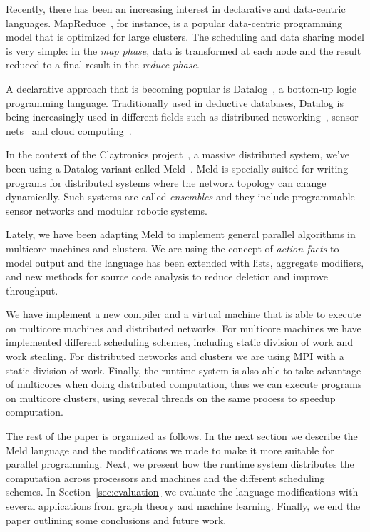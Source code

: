 \documentclass[preprint]{sigplanconf}
\begin{document}
Recently, there has been an increasing interest in declarative and data-centric languages.
MapReduce~\cite{Dean:2008:MSD:1327452.1327492}, for instance, is a popular data-centric programming
model that is optimized for large clusters. The scheduling and data sharing model is very simple:
in the \emph{map phase}, data is transformed at each node and the result reduced to a final
result in the \emph{reduce phase}.

A declarative approach that is becoming popular is Datalog~\cite{Ullman:1990:PDK:533142}, a
bottom-up logic programming language.
Traditionally used in deductive databases, Datalog is being increasingly used in different fields
such as distributed networking~\cite{Loo-condie-garofalakis-p2}, sensor
nets~\cite{Chu:2007:DID:1322263.1322281} and cloud computing~\cite{alvaro:boom}.

In the context of the Claytronics project~\cite{goldstein-computer05}, a massive distributed system,
we've been using a Datalog variant called Meld~\cite{ashley-rollman-iclp09, ashley-rollman-derosa-iros07wksp}.
Meld is specially suited for writing programs for distributed systems where the network
topology can change dynamically. Such systems are called \emph{ensembles} and they include
programmable sensor networks and modular robotic systems.

Lately, we have been adapting Meld to implement general parallel algorithms in multicore machines
and clusters. We are using the concept of \emph{action facts} to model output and the language
has been extended with lists, aggregate modifiers, and new methods for source code analysis to
reduce deletion and improve throughput.

We have implement a new compiler and a virtual machine that is able to execute on multicore machines
and distributed networks. For multicore machines we have implemented different scheduling schemes,
including static division of work and work stealing.
For distributed networks and clusters we are using MPI with a static division of work.
Finally, the runtime system is also able to take advantage of multicores when doing distributed computation,
thus we can execute programs on multicore clusters, using several threads on the same process to speedup
computation.

The rest of the paper is organized as follows. In the next section we describe the Meld language
and the modifications we made to make it more suitable for parallel programming. Next, we present
how the runtime system distributes the computation across processors and machines and the different
scheduling schemes. In Section~\ref{sec:evaluation} we evaluate the language modifications with
several applications from graph theory and machine learning. Finally, we end the paper outlining
some conclusions and future work.
\end{document}
